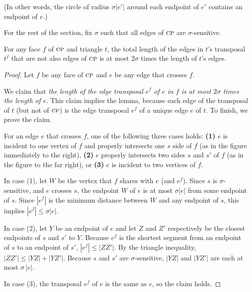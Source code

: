\documentclass[final]{siamltex}
\newcommand{\transposal}[2]{{#1}^{#2}}
\newcommand{\edge}{e}
\newcommand{\face}{f}
\newcommand{\tri}{t}  \newcommand{\vertex}{v}
\newcommand{\sensitivity}{\sigma}
\newcommand{\Picture}[1]{}
\newcommand{\xfigpdf}[1]{\Picture{#1.pdf_t}}
\newcommand{\xfig}[1]{\xfigpdf{#1}}
\begin{document}
(In other words, the circle of radius $\sensitivity|\edge'|$
around each endpoint of $\edge'$ contains an endpoint of $\edge$.)

For the rest of the section, fix $\sensitivity$ 
such that all edges of $\text{\sc cp}$ are $\sensitivity$-sensitive.

\begin{lemma}\label{lemma:sensitive}
For any face $\face$ of $\text{\sc cp}$ and triangle $\tri$,
  the total length of the edges in $\tri$'s transposal $\transposal{\tri}{\face}$
  that are not also edges of $\text{\sc cp}$
  is at most $2 \sensitivity$ times the length of $\tri$'s edges.
\end{lemma}

\begin{proof}  Let $\face$ be any face of $\text{\sc cp}$ and $\edge$ be any edge that crosses $\face$. 

    We claim that {\em the length of the edge transposal $\transposal{\edge}{\face}$
      of $\edge$ in $\face$ is at most $2 \sensitivity$ times the length of $\edge$}.
    This claim implies the lemma,
    because each edge of the transposal of $\tri$ (but not of $\text{\sc cp}$)
    is the edge transposal $\transposal{\edge}{\face}$
    of a unique edge $\edge$ of $\tri$.
    To finish, we prove the claim.
  \begin{window}[0,r,{\scalebox{.5}{\xfig{transposal-length}}},{}]
    For an edge $\edge$ that crosses $\face$, one of the following three cases holds:
    {\bf (1)} $\edge$ is incident to one vertex of $\face$ and properly intersects one $s$ side of $\face$
    (as in the figure immediately to the right),
    {\bf (2)} $\edge$ properly intersects two sides $s$ and $s'$ of $\face$
    (as in the figure to the far right),
    or
    {\bf (3)} $\edge$ is incident to two vertices of $\face$.


\hspace*{\parindent}In case (1), let $W$ be the vertex that $\face$ shares with $\edge$ (and $\transposal{\edge}{\face}$).
 Since $s$ is $\sensitivity$-sensitive, and $\edge$ crosses $s$,
 the endpoint $W$ of $\edge$ is at most $\sensitivity|\edge|$ 
 from some endpoint of $s$.
 Since $|\transposal{\edge}{\face}|$ is the minimum distance
 between $W$ and any endpoint of $s$, this implies
 $|\transposal{\edge}{\face}| \le \sensitivity|\edge|$.

 \end{window}


 In case (2), let $Y$ be an endpoint of $\edge$ and let $Z$ and $Z'$ respectively be 
 the closest endpoints of $s$ and $s'$ to $Y$.
 Because $\transposal{\edge}{\face}$ is the shortest segment 
 from an endpoint of $s$ to an endpoint of $s'$,
 $|\transposal{\edge}{\face}|\le |Z Z'|$.
 By the triangle inequality,
 \(
 |Z Z'| \le |Y Z| + |Y Z'|.
 \)
 Because $s$ and $s'$ are $\sensitivity$-sensitive,
 $|Y Z|$ and $|Y Z'|$ are each at most $\sensitivity\,|\edge|$.

 In case (3), the transposal $\transposal{\edge}{\face}$ of $\edge$ is the same as $\edge$, 
 so  the claim holds.
\end{proof}
\end{document}
